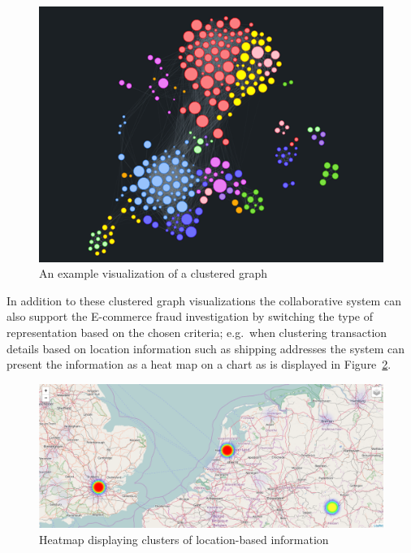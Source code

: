 \begin{figure}[H]
  \centering
  \includegraphics[width=0.9\columnwidth]{images/GraphViz.png}
  \caption[An example visualization of a clustered graph]{An example visualization of a clustered graph \citep{visjsshowcase}}
\label{fig:images_graph_viz}
\end{figure}

 In addition to these clustered graph visualizations the collaborative system can also support the \gls{E-commerce} fraud investigation by switching the type of representation based on the chosen criteria; e.g.\ when clustering transaction details based on location information such as shipping addresses the system can present the information as a heat map on a chart as is displayed in Figure~\ref{fig:images_map_heatmap}. \@

\begin{figure}[H]
  \centering
  \includegraphics[width=0.9\columnwidth]{images/Heatmap.png}
  \caption{Heatmap displaying clusters of location-based information}
\label{fig:images_map_heatmap}
\end{figure}

